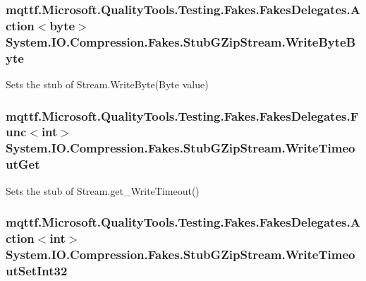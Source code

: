 \hypertarget{class_system_1_1_i_o_1_1_compression_1_1_fakes_1_1_stub_g_zip_stream_abaadec7953354258ba221aeee5947c49}{
\subsubsection[{Write\-Byte\-Byte}]{\setlength{\rightskip}{0pt plus 5cm}mqttf.\-Microsoft.\-Quality\-Tools.\-Testing.\-Fakes.\-Fakes\-Delegates.\-Action$<$byte$>$ System.\-I\-O.\-Compression.\-Fakes.\-Stub\-G\-Zip\-Stream.\-Write\-Byte\-Byte}}\label{class_system_1_1_i_o_1_1_compression_1_1_fakes_1_1_stub_g_zip_stream_abaadec7953354258ba221aeee5947c49}


Sets the stub of Stream.\-Write\-Byte(\-Byte value)

\hypertarget{class_system_1_1_i_o_1_1_compression_1_1_fakes_1_1_stub_g_zip_stream_a7e51c58504c45dff26e9b65c2b0c7073}{
\subsubsection[{Write\-Timeout\-Get}]{\setlength{\rightskip}{0pt plus 5cm}mqttf.\-Microsoft.\-Quality\-Tools.\-Testing.\-Fakes.\-Fakes\-Delegates.\-Func$<$int$>$ System.\-I\-O.\-Compression.\-Fakes.\-Stub\-G\-Zip\-Stream.\-Write\-Timeout\-Get}}\label{class_system_1_1_i_o_1_1_compression_1_1_fakes_1_1_stub_g_zip_stream_a7e51c58504c45dff26e9b65c2b0c7073}


Sets the stub of Stream.\-get\-\_\-\-Write\-Timeout()

\hypertarget{class_system_1_1_i_o_1_1_compression_1_1_fakes_1_1_stub_g_zip_stream_a79b0c460894fec9791335a9ff6cfa361}{
\subsubsection[{Write\-Timeout\-Set\-Int32}]{\setlength{\rightskip}{0pt plus 5cm}mqttf.\-Microsoft.\-Quality\-Tools.\-Testing.\-Fakes.\-Fakes\-Delegates.\-Action$<$int$>$ System.\-I\-O.\-Compression.\-Fakes.\-Stub\-G\-Zip\-Stream.\-Write\-Timeout\-Set\-Int32}}\label{class_system_1_1_i_o_1_1_compression_1_1_fakes_1_1_stub_g_zip_stream_a79b0c460894fec9791335a9ff6cfa361}


